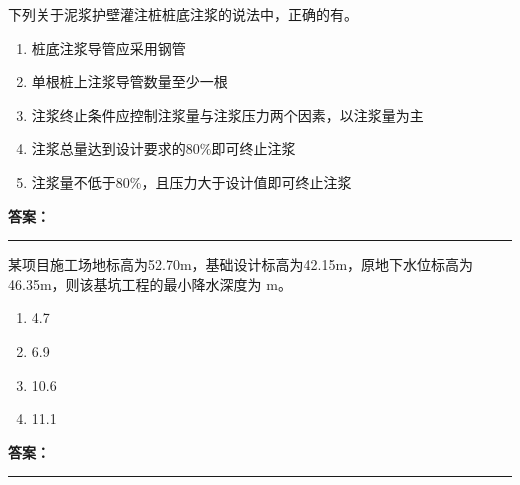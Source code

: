 \documentclass[UTF8,fontset=fandol,11pt]{ctexart}
\newcommand{\answerline}{\textcolor{answerred}{\rule{2.4cm}{0.7pt}}}
\begin{document}
\begin{quizbox}[title={乱序第 189 题｜第二章桩基础工程}]

下列关于泥浆护壁灌注桩桩底注浆的说法中，正确的有。\\

\begin{enumerate}[label=\Alph*.]

\item 桩底注浆导管应采用钢管

\item 单根桩上注浆导管数量至少一根

\item 注浆终止条件应控制注浆量与注浆压力两个因素，以注浆量为主

\item 注浆总量达到设计要求的80\%即可终止注浆

\item 注浆量不低于80\%，且压力大于设计值即可终止注浆

\end{enumerate}

\textbf{\textcolor{answerred}{答案：}} \answerline

\end{quizbox}

\vspace{0.2em}

\begin{quizbox}[title={乱序第 190 题｜第三章基坑工程}]

某项目施工场地标高为52.70m，基础设计标高为42.15m，原地下水位标高为46.35m，则该基坑工程的最小降水深度为 m。\\

\begin{enumerate}[label=\Alph*.]

\item 4.7

\item 6.9

\item 10.6

\item 11.1

\end{enumerate}

\textbf{\textcolor{answerred}{答案：}} \answerline

\end{quizbox}

\vspace{0.2em}
\end{document}
